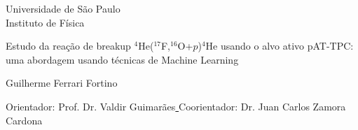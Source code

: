 \documentclass[a4paper,12pt,oneside]{book}
\begin{document}
\pagestyle{plain}
\renewcommand*\contentsname{Sumário}
\renewcommand{\listfigurename}{Lista de figuras}
\renewcommand{\listoftables}{Tabelas}
\renewcommand{\listofalgorithms}{Lista de algoritmos}
\makeatletter
\renewcommand{\@chapapp}{Capítulo}
\makeatother



\thispagestyle{empty}
\begin{center}

	{\fontsize{16}{16} \selectfont Universidade de S\~ao Paulo \\}
	\vspace{0.1cm}
	{\fontsize{16}{16} \selectfont Instituto de F\'{i}sica}
    \vspace{2.2cm}

	{\fontsize{22}{22}\selectfont Estudo da reação de breakup $^4$He($^{17}$F,$^{16}$O+$p$)$^4$He usando o alvo ativo pAT-TPC: uma abordagem usando técnicas de Machine Learning\par}
    \vspace{2cm}


    {\fontsize{18}{18}\selectfont Guilherme Ferrari Fortino\par}

    \vspace{1.4cm}

\end{center}

\leftskip 6cm
\begin{flushright}	
\leftskip 6cm
Orientador: Prof. Dr.  Valdir Guimarães\underline{ \hskip 5cm  } 
\leftskip 6cm
Coorientador: Dr. Juan Carlos Zamora Cardona  \underline{ \hskip 5cm  }
\end{flushright}	

\vspace{0.6cm}    

\end{document}
